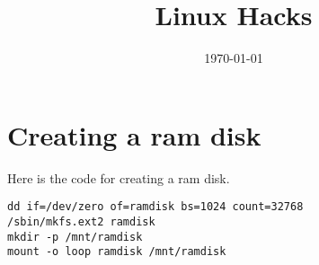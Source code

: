 \documentclass[11pt]{article}
\title{Linux Hacks}
\date{\today}
\begin{document}
\maketitle

\newpage

\tableofcontents

\newpage

\section{Creating a ram disk}
Here is the code for creating a ram disk.

\begin{verbatim}
dd if=/dev/zero of=ramdisk bs=1024 count=32768
/sbin/mkfs.ext2 ramdisk
mkdir -p /mnt/ramdisk
mount -o loop ramdisk /mnt/ramdisk
\end{verbatim}
\end{document}
